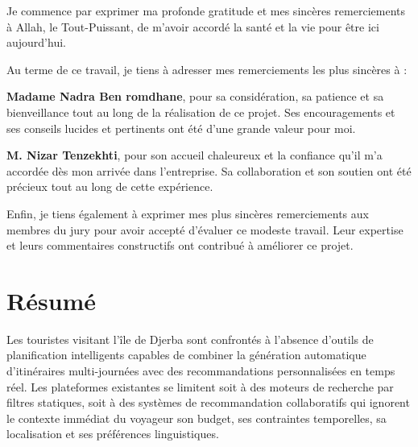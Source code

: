 \begin{center}
\begin{large}
Je commence par exprimer ma profonde gratitude et mes sincères remerciements à Allah, le Tout-Puissant, de m'avoir accordé la santé et la vie pour être ici aujourd'hui.

Au terme de ce travail, je tiens à adresser mes remerciements les plus sincères à :

\begin{flushleft}
\textbf{Madame Nadra Ben romdhane}, pour sa considération, sa patience et sa bienveillance tout au long de la réalisation de ce projet. Ses encouragements et ses conseils lucides et pertinents ont été d'une grande valeur pour moi.
\end{flushleft}

\begin{flushleft}
\textbf{M. Nizar Tenzekhti}, pour son accueil chaleureux et la confiance qu'il m'a accordée dès mon arrivée dans l'entreprise. Sa collaboration et son soutien ont été précieux tout au long de cette expérience.
\end{flushleft}

Enfin, je tiens également à exprimer mes plus sincères remerciements aux membres du jury pour avoir accepté d'évaluer ce modeste travail. Leur expertise et leurs commentaires constructifs ont contribué à améliorer ce projet.
\end{large}
\end{center}


\newpage
\chapter*{Résumé}

Les touristes visitant l'île de Djerba sont confrontés à l'absence d'outils
de planification intelligents capables de combiner la génération automatique
d'itinéraires multi-journées avec des recommandations personnalisées en temps
réel. Les plateformes existantes se limitent soit à des moteurs de recherche
par filtres statiques, soit à des systèmes de recommandation collaboratifs qui
ignorent le contexte immédiat du voyageur   son budget, ses contraintes
temporelles, sa localisation et ses préférences linguistiques.

